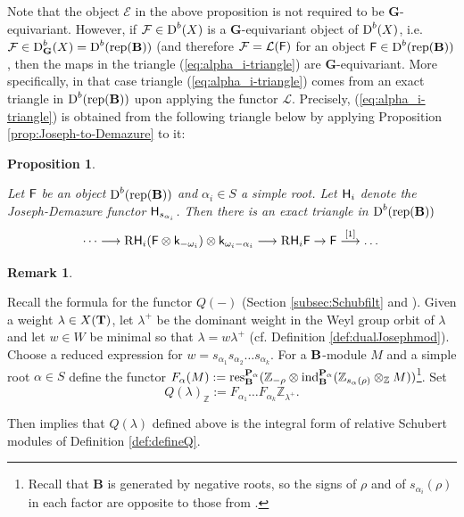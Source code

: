 \documentclass[sn-mathphys-num]{sn-jnl}%
\newcommand{\Ff}{\mathcal F}
\newcommand{\Ee}{\mathcal E}
\newcommand{\Ll}{\mathcal L}
\newcommand{\rep}{{\mathrm{rep}}}
\newcommand{\ind}{{\mathrm{ind}}}
\newcommand{\res}{{\mathrm{res}}}
\newcommand*{\Dd}{\mathop{\mathrm D\kern0pt}\nolimits}
\newcommand{\sH}{{\sf H}}
\newcommand{\bg}{\mathbf G}
\newcommand{\fb}{\mathbf B}
\newtheorem{proposition}[theorem]{Proposition}
\theoremstyle{definition}
\newtheorem{remark}[theorem]{Remark}
\begin{document}
Note that the object $\Ee$ in the above proposition is not required to be $\bg$-equivariant. However, if $\Ff\in \Dd ^b(X)$ is a $\bg$-equivariant object of $\Dd ^b(X)$, i.e. $\Ff \in \Dd ^b_{\bg}(X)=\Dd ^b(\rep(\fb))$ (and therefore $\Ff=\Ll(\sf F)$ for an object ${\sf F}\in \Dd ^b(\rep(\fb))$, then the maps in the triangle (\ref{eq:alpha_i-triangle}) are $\bg$-equivariant. More specifically, in that case triangle (\ref{eq:alpha_i-triangle}) comes from an exact triangle in $\Dd ^b(\rep(\fb))$ upon applying the functor $\Ll$. Precisely, (\ref{eq:alpha_i-triangle}) is obtained from the following triangle below 
by applying Proposition \ref{prop:Joseph-to-Demazure} to it:
\begin{proposition}\label{prop:repB-alpha_i-triangle}

Let ${\sf F}$ be an object $\Dd ^b(\rep(\fb))$ and $\alpha _i\in S$ a simple root. Let ${\sH}_i$ denote the Joseph-Demazure functor ${\sH}_{s_{\alpha _i}}$. Then there is an exact triangle in $\Dd ^b(\rep(\fb))$
\begin{equation}\label{eq:repB-alpha_i-triangle}
\dots \longrightarrow {\rm R}{\sH}_i({\sf F}\otimes {\sf k}_{-\omega _i})\otimes {\sf k}_{\omega _i-\alpha_i}\longrightarrow {\rm R}{\sH}_i{\sf F} \rightarrow {\sf F} \stackrel{[1]}\longrightarrow \dots 
\end{equation}
\end{proposition}

\begin{remark}\label{rem:Q_alternate}
{Recall the formula for the functor $Q(-)$ (Section \ref{subsec:Schubfilt} and \cite[Definition 7.2.1]{WvdKTata}). Given a weight $\lambda \in X({\bf T})$, let $\lambda^+$ be the dominant weight in the Weyl group orbit of $\lambda$ and let $w\in W$ be minimal so that $\lambda=w\lambda^+$ (cf. Definition \ref{def:dualJosephmod}). Choose a reduced expression for $w=s_{\alpha _1}s_{\alpha _2}\dots s_{\alpha _k}$. For a ${\bf B}$-module $M$ and a simple root $\alpha \in S$ define the functor $F_{\alpha}(M):={\res}_{\bf B}^{{\bf P}_{\alpha}}({\mathbb Z}_{-\rho}\otimes {\ind}_{\bf B}^{{\bf P}_{\alpha}}({\mathbb Z}_{s_{\alpha}(\rho)}\otimes _{\mathbb Z}M))$\footnote{Recall that $\fb$ is generated by negative roots, so the signs of $\rho$ and of $s_{\alpha _i}(\rho)$ in each factor are opposite to those from \cite[Definition 7.2.1]{WvdKTata}.}. Set 
\begin{equation}\label{eq:Q_integral}
Q(\lambda)_{\mathbb Z}:=F_{\alpha _1}\dots F_{\alpha _k}{\mathbb Z}_{\lambda^+}.
\end{equation}

Then \cite[Proposition 7.2.2]{WvdKTata} implies that $Q(\lambda)$ defined above is the integral form of relative Schubert modules of Definition \ref{def:defineQ}.
}
\end{remark}
\end{document}
